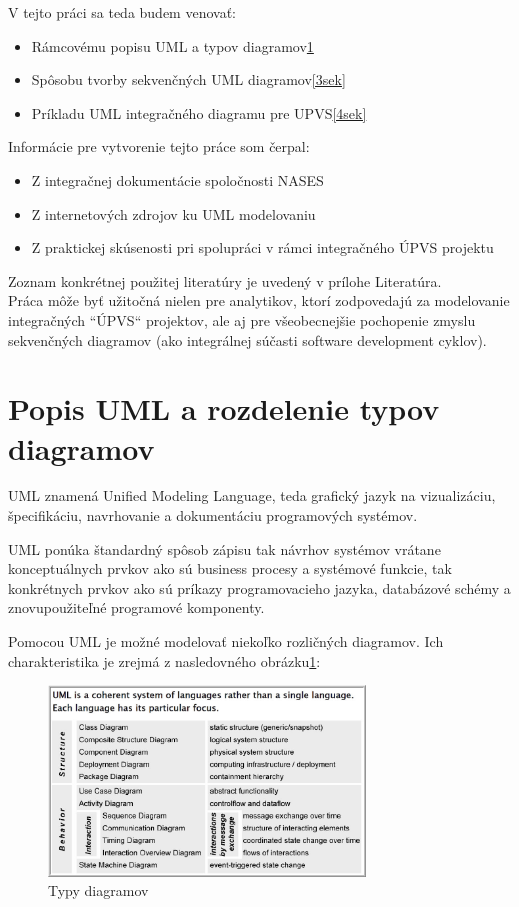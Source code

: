 \documentclass[10pt,twoside,slovak,a4paper]{article}
\begin{document}
V tejto práci sa teda budem venovať:

\begin{itemize}
\item Rámcovému popisu UML a typov diagramov\ref{2sek}
\item Spôsobu tvorby sekvenčných UML diagramov\ref{3sek}
\item Príkladu UML integračného diagramu pre UPVS\ref{4sek}
\end{itemize}

Informácie pre vytvorenie tejto práce som čerpal:

\begin{itemize}
\item Z integračnej dokumentácie spoločnosti NASES
\item Z internetových zdrojov ku UML modelovaniu
\item Z praktickej skúsenosti pri spolupráci v rámci integračného ÚPVS projektu
\end{itemize}
Zoznam konkrétnej použitej literatúry je uvedený v prílohe Literatúra.\\

Práca môže byť užitočná nielen pre analytikov, ktorí zodpovedajú za modelovanie integračných ``ÚPVS“ projektov, ale aj pre všeobecnejšie pochopenie zmyslu sekvenčných diagramov (ako integrálnej súčasti software development cyklov).




\section{Popis UML a rozdelenie typov diagramov} \label{2sek}

UML znamená Unified Modeling Language, teda grafický jazyk na vizualizáciu, špecifikáciu, navrhovanie a dokumentáciu programových systémov. 

UML ponúka štandardný spôsob zápisu tak návrhov systémov vrátane konceptuálnych prvkov ako sú business procesy a systémové funkcie, tak konkrétnych prvkov ako sú príkazy programovacieho jazyka, databázové schémy a znovupoužiteľné programové komponenty.\cite{WIKI}\newpage

Pomocou UML je možné modelovať niekoľko rozličných diagramov. Ich charakteristika je zrejmá z nasledovného obrázku\ref{TypyD}:


\begin{figure}[h]
\centering
\includegraphics[width=0.75\textwidth]{Images/Obr1.jpg}
\caption{Typy diagramov\cite{UMLUni}}
\label{TypyD}
\end{figure}
\end{document}
